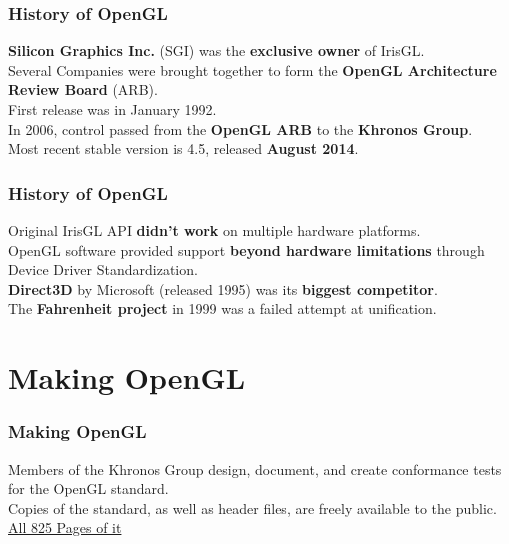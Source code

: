 \documentclass[10pt, compress]{beamer}
\begin{document}
\begin{frame}[fragile]
    \frametitle{History of OpenGL}
    \begin{center} 
    \textbf{Silicon Graphics Inc.} (SGI) was the \textbf{exclusive owner} of IrisGL. \\ Several Companies were brought together to form the \textbf{OpenGL Architecture Review Board} (ARB). \\ \vspace{3mm} First release was in January 1992. \\ In 2006, control passed from the \textbf{OpenGL ARB} to the \textbf{Khronos Group}. \\ Most recent stable version is 4.5, released \textbf{August 2014}.
    \end{center}
\end{frame}

\begin{frame}[fragile]
    \frametitle{History of OpenGL}
    \begin{center} 
    Original IrisGL API \textbf{didn't work} on multiple hardware platforms. \\ \vspace{3mm} OpenGL software provided support \textbf{beyond hardware limitations} through Device Driver Standardization. \\ \vspace{3mm} \textbf{Direct3D} by Microsoft (released 1995) was its \textbf{biggest competitor}. \\ The \textbf{Fahrenheit project} in 1999 was a failed attempt at unification.
    \end{center}
\end{frame}

\section{Making OpenGL}

\begin{frame}[fragile]
    \frametitle{Making OpenGL}
    \begin{center} Members of the Khronos Group design, document, and create conformance tests for the OpenGL standard. \\ \vspace{3mm} Copies of the standard, as well as header files, are freely available to the public. \\ \vspace{3mm}
    \href{https://www.opengl.org/registry/doc/glspec45.core.pdf}{\alert{All 825 Pages of it}}
    \end{center}
\end{frame}
\end{document}
